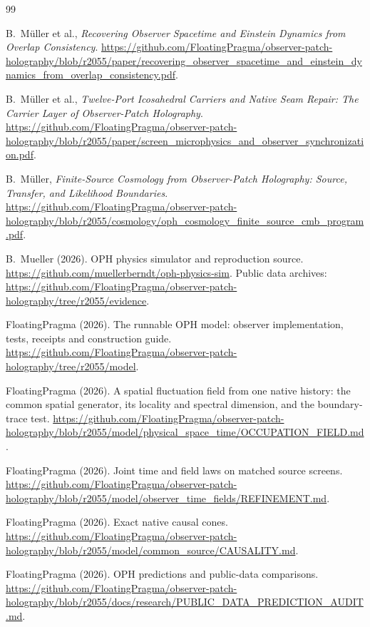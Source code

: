 \documentclass[11pt]{article}
\theoremstyle{remark}
\theoremstyle{plain}
\begin{document}
\begin{thebibliography}{99}

B.~M\"uller et al.,
\emph{Recovering Observer Spacetime and Einstein Dynamics from Overlap Consistency}.
\url{https://github.com/FloatingPragma/observer-patch-holography/blob/r2055/paper/recovering_observer_spacetime_and_einstein_dynamics_from_overlap_consistency.pdf}.

B.~M\"uller et al.,
\emph{Twelve-Port Icosahedral Carriers and Native Seam Repair: The Carrier Layer of Observer-Patch Holography}.
\url{https://github.com/FloatingPragma/observer-patch-holography/blob/r2055/paper/screen_microphysics_and_observer_synchronization.pdf}.

B.~M\"uller, \emph{Finite-Source Cosmology from Observer-Patch Holography:
Source, Transfer, and Likelihood Boundaries}.
\url{https://github.com/FloatingPragma/observer-patch-holography/blob/r2055/cosmology/oph_cosmology_finite_source_cmb_program.pdf}.

B.~Mueller (2026). OPH physics simulator and reproduction source.
\url{https://github.com/muellerberndt/oph-physics-sim}. Public data archives:
\url{https://github.com/FloatingPragma/observer-patch-holography/tree/r2055/evidence}.

FloatingPragma (2026). The runnable OPH model: observer implementation,
tests, receipts and construction guide.
\url{https://github.com/FloatingPragma/observer-patch-holography/tree/r2055/model}.

FloatingPragma (2026). A spatial fluctuation field from one native history:
the common spatial generator, its locality and spectral dimension, and the
boundary-trace test.
\url{https://github.com/FloatingPragma/observer-patch-holography/blob/r2055/model/physical_space_time/OCCUPATION_FIELD.md}.

FloatingPragma (2026). Joint time and field laws on matched source screens.
\url{https://github.com/FloatingPragma/observer-patch-holography/blob/r2055/model/observer_time_fields/REFINEMENT.md}.

FloatingPragma (2026). Exact native causal cones.
\url{https://github.com/FloatingPragma/observer-patch-holography/blob/r2055/model/common_source/CAUSALITY.md}.

FloatingPragma (2026). OPH predictions and public-data comparisons.
\url{https://github.com/FloatingPragma/observer-patch-holography/blob/r2055/docs/research/PUBLIC_DATA_PREDICTION_AUDIT.md}.


\end{thebibliography}
\end{document}
